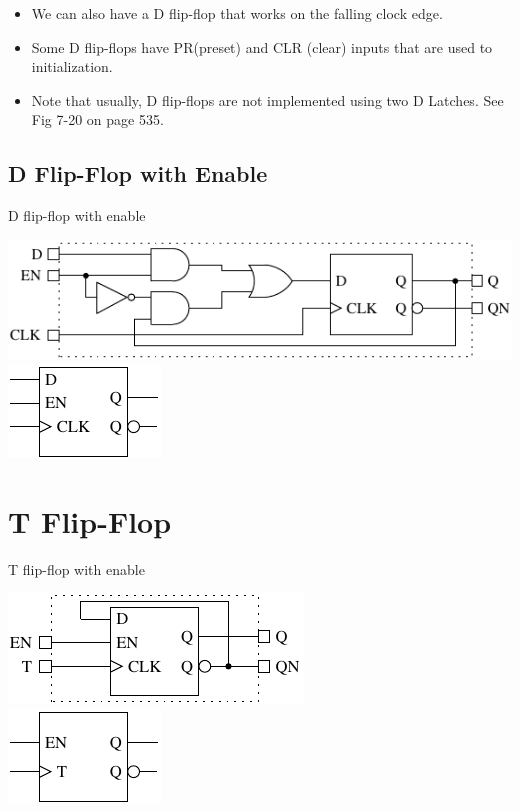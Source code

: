 \begin{itemize}
  \item We can also have a D flip-flop that works on the falling clock edge.
  \item Some D flip-flops have PR(preset) and CLR (clear) inputs that are used to initialization.
  \item Note that usually, D flip-flops are not implemented using two D Latches.  See Fig 7-20 on page 535.
\end{itemize}

\subsection{D Flip-Flop with Enable}

\begin{frame}{D flip-flop with enable}
  \begin{center}
    \includegraphics{DFlipFlopLogicWithEnable} \\
    \includegraphics{DFlipFlopSchematicWithEnable}
  \end{center}
\end{frame}

\section{T Flip-Flop}
\begin{frame}{T flip-flop with enable}
  \begin{center}
    \includegraphics{TFlipFlopLogic} \\
    \includegraphics{TFlipFlopSchematic}
  \end{center}
\end{frame}


